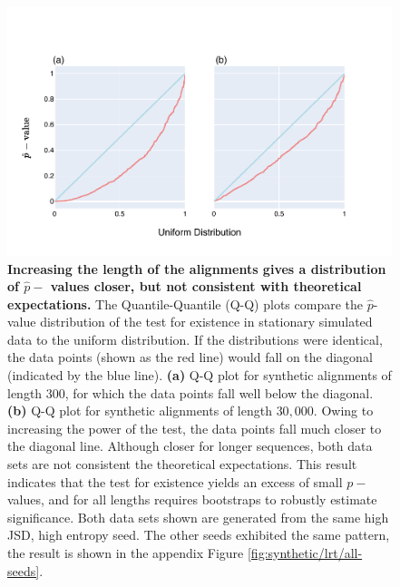 \begin{figure}[htbp]
\centering
\includegraphics[width=\textwidth]{figures/plots/synthetic/lrt/197113_332182_17210-long_seq.pdf}
\caption{\textbf{Increasing the length of the alignments gives a distribution of $\hat p-$ values closer, but not consistent with theoretical expectations.} The Quantile-Quantile (Q-Q) plots compare the $\hat p$-value distribution of the test for existence in stationary simulated data to the uniform distribution. If the distributions were identical, the data points (shown as the red line) would fall on the diagonal (indicated by the blue line). \textbf{(a)} Q-Q plot for synthetic alignments of length $300$, for which the data points fall well below the diagonal. \textbf{(b)} Q-Q plot for synthetic alignments of length $30,000$. Owing to increasing the power of the test, the data points fall much closer to the diagonal line. Although closer for longer sequences, both data sets are not consistent the theoretical expectations. This result indicates that the test for existence yields an excess of small $p-$ values, and for all lengths requires bootstraps to robustly estimate significance. Both data sets shown are generated from the same high JSD, high entropy seed. The other seeds exhibited the same pattern, the result is shown in the appendix Figure \ref{fig:synthetic/lrt/all-seeds}.}
\label{fig:synthetic/lrt/197113-long_seq}
\end{figure}